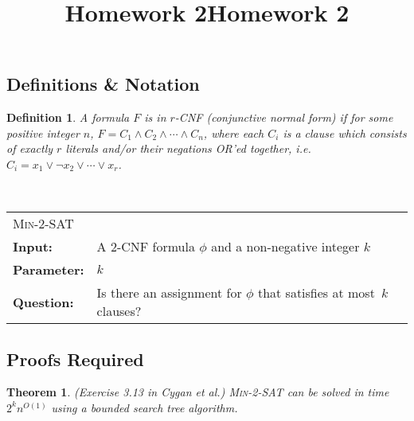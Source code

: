 \documentclass{article}
\title{Homework 2}
\title{Homework 2}
\newcommand{\defproblem}[4]{%
  \hfill\\\smallskip\noindent%
  \begin{tabularx}{\textwidth}{|l X|}%
    \hline%
    \multicolumn{2}{|l|}{\pname{#1}}\\%
    \textbf{Input:}&#2\\%
    \textbf{Parameter:}&#3\\%
    \textbf{Question:}&#4\smallskip\\\hline%
  \end{tabularx}%
  \smallskip%
}%
\newcommand{\pname}[1]{\textnormal{\textsc{#1}}}
\newtheorem*{theorem}{Theorem}
\newtheorem{definition}{Definition}
\begin{document}
\maketitle


\subsection*{Definitions \& Notation}
\begin{definition}
A formula $F$ is in \emph{$r$-CNF} (conjunctive normal form) if for some positive
integer $n$, $F = C_1 \land C_2 \land \cdots \land C_n$, where each $C_i$ is a \emph{clause} which
consists of exactly $r$ literals and/or their negations \textsc{OR}'ed together, i.e.
$C_i = x_1 \lor \neg x_2 \lor \cdots \lor x_r$.
\end{definition}


\defproblem{Min-$2$-SAT}
%
{A 2-CNF formula $\phi$ and a non-negative integer $k$}
%
{$k$}
%
{Is there an assignment for $\phi$ that satisfies at most~$k$ clauses?}
%


\subsection*{Proofs Required}

\begin{theorem} ({\small Exercise 3.13 in Cygan et al.}) \pname{Min-2-SAT} can be solved in
  time $2^kn^{O(1)}$ using a bounded search tree algorithm.
\end{theorem}
\end{document}
